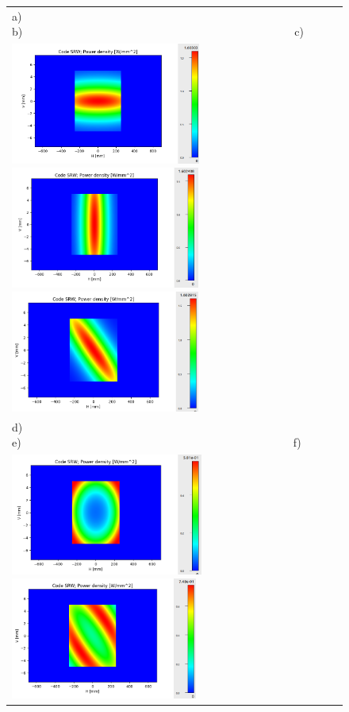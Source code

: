 \documentclass[]{spie}  %
\begin{document}
\begin{figure} [ht]
\begin{center}
\begin{tabular}{l} 
   a)~~~~~~~~~~~~~~~~~~~~~~~~~~~~~~~~~~~~~~~~~~~~~~~~~
   b)~~~~~~~~~~~~~~~~~~~~~~~~~~~~~~~~~~~~~~~~~~~~~~~~~c)\\
   \includegraphics[height=4cm]{figures/powerdensityKv.png}
   \includegraphics[height=4cm]{figures/powerdensityKh.png}
   \includegraphics[height=4cm]{figures/powerdensityKhKv.png} \\
      d)~~~~~~~~~~~~~~~~~~~~~~~~~~~~~~~~~~~~~~~~~~~~~~~~~
      e)~~~~~~~~~~~~~~~~~~~~~~~~~~~~~~~~~~~~~~~~~~~~~~~~~f)\\
      \includegraphics[height=4cm]{figures/powerdensityKhKv90.png}
      \includegraphics[height=4cm]{figures/powerdensityKhKv45.png}

\end{tabular}
\end{center}
\end{figure}
\end{document}
